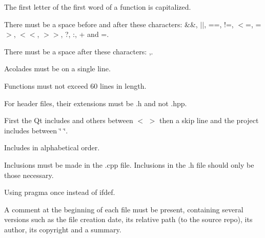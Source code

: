 \begin{DoxyItemize}
\begin{DoxyItemize}
\begin{DoxyItemize}
\end{DoxyItemize}
\end{DoxyItemize}
\item The first letter of the first word of a function is capitalized.
\item There must be a space before and after these characters\+: \textquotesingle{}\&\&\textquotesingle{}, \textquotesingle{}$\vert$$\vert$\textquotesingle{}, \textquotesingle{}==\textquotesingle{}, \textquotesingle{}!=\textquotesingle{}, \textquotesingle{}$<$=\textquotesingle{}, \textquotesingle{}=$>$\textquotesingle{}, \textquotesingle{}$<$$<$\textquotesingle{}, \textquotesingle{}$>$$>$\textquotesingle{}, \textquotesingle{}?\textquotesingle{}, \textquotesingle{}\+:\textquotesingle{}, \textquotesingle{}+\textquotesingle{} and \textquotesingle{}=\textquotesingle{}.
\item There must be a space after these characters\+: \textquotesingle{},\textquotesingle{}.
\item Acolades must be on a single line.
\item Functions must not exceed 60 lines in length.
\item For header files, their extensions must be .h and not .hpp.
\item First the Qt includes and others between \textquotesingle{}$<$\textquotesingle{} \textquotesingle{}$>$\textquotesingle{} then a skip line and the project includes between \textquotesingle{}\char`\"{}\textquotesingle{} \textquotesingle{}\char`\"{}\textquotesingle{}.
\item Includes in alphabetical order.
\item Inclusions must be made in the .cpp file. Inclusions in the .h file should only be those necessary.
\item Using pragma once instead of ifdef.
\item A comment at the beginning of each file must be present, containing several versions such as the file creation date, its relative path (to the source repo), its author, its copyright and a summary. 
\end{DoxyItemize}